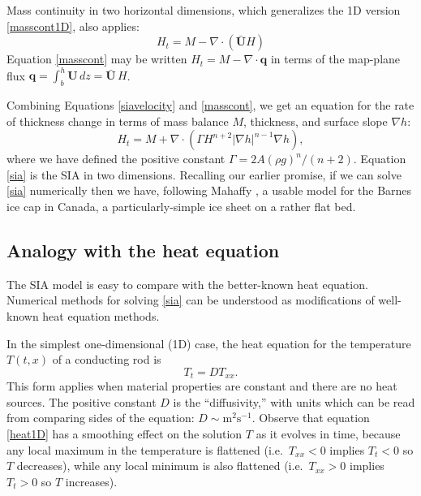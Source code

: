 \documentclass[letterpaper,final,12pt,reqno]{amsart}
\newcommand{\bq}{\mathbf{q}}
\newcommand{\grad}{\nabla}
\newcommand{\Div}{\nabla\cdot}
\begin{document}
Mass continuity in two horizontal dimensions, which generalizes the 1D version \eqref{masscont1D}, also applies:
\begin{equation}
    H_t = M - \Div\left(\bar{\mathbf{U}} H\right)  \label{masscont}
\end{equation}
Equation \eqref{masscont} may be written $H_t = M - \Div \bq$ in terms of the map-plane flux $\bq = \int_{b}^{h} \mathbf{U}\,dz = \bar{\mathbf{U}}\,H$.

Combining Equations \eqref{siavelocity} and \eqref{masscont}, we get an equation for the rate of thickness change in terms of mass balance $M$, thickness, and surface slope $\grad h$:
\begin{equation}
H_t = M + \Div \left(\Gamma H^{n+2} |\grad h|^{n-1} \grad h \right), \label{sia}
\end{equation}
where we have defined the positive constant $\Gamma = 2 A (\rho g)^n / (n+2)$.  Equation \eqref{sia} is the SIA in two dimensions.  Recalling our earlier promise, if we can solve \eqref{sia} numerically then we have, following Mahaffy \cite{Mahaffy}, a usable model for the Barnes ice cap in Canada, a particularly-simple ice sheet on a rather flat bed.

\subsection*{Analogy with the heat equation}  The SIA model is easy to compare with the better-known heat equation.  Numerical methods for solving \eqref{sia} can be understood as modifications of well-known heat equation methods.

In the simplest one-dimensional (1D) case, the heat equation for the temperature $T(t,x)$ of a conducting rod is
\begin{equation}
  T_t = D T_{xx}. \label{heat1D}
\end{equation}
This form applies when material properties are constant and there are no heat sources.  The positive constant $D$ is the ``diffusivity,'' with units which can be read from comparing sides of the equation: $D\sim \text{m}^2 \text{s}^{-1}$.  Observe that equation \eqref{heat1D} has a smoothing effect on the solution $T$ as it evolves in time, because any local maximum in the temperature is flattened (i.e.~$T_{xx}<0$ implies $T_t<0$ so $T$ decreases), while any local minimum is also flattened (i.e.~$T_{xx}>0$ implies $T_t>0$ so $T$ increases).
\end{document}
